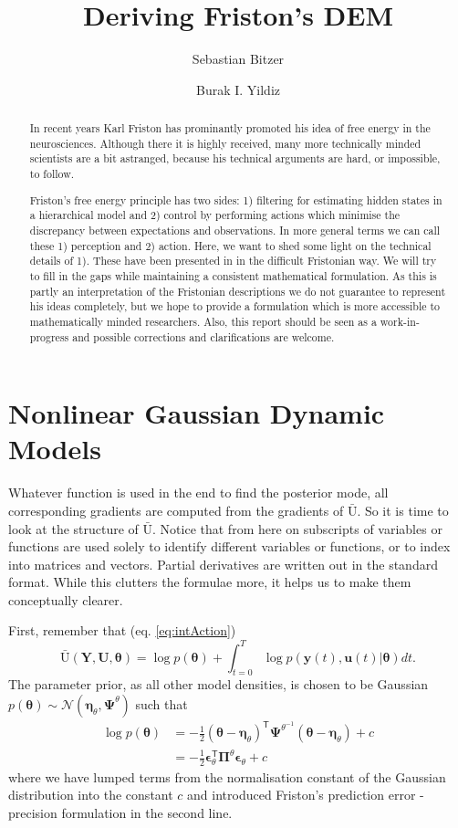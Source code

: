 \documentclass[a4paper,10pt]{article}
\title{Deriving Friston's DEM}
\author{Sebastian Bitzer \and Burak I. Yildiz}
\newcommand{\bs}[1]{\mathbf{#1}}					%
\newcommand{\bgs}[1]{\boldsymbol{#1}}				%
\newcommand{\tr}{\mathsf{T}}				%
\renewcommand{\ss}{u}         %
\newcommand{\so}{y}         %
\newcommand{\spe}{\epsilon} %
\renewcommand{\sp}{\theta}    %
\newcommand{\ps}{\bs{\ss}}    %
\newcommand{\po}{\bs{\so}}    %
\newcommand{\ppe}{\bgs{\spe}} %
\newcommand{\pp}{\bgs{\sp}} %
\newcommand{\Ps}{\bs{U}}    %
\newcommand{\Po}{\bs{Y}}    %
\newcommand{\Ua}{\bar{\mathrm{U}}}		%
\newcommand{\N}{\mathcal{N}}			%
\begin{document}
\maketitle

\begin{abstract}
In recent years Karl Friston has prominantly promoted his idea of free energy in the neurosciences. Although there it is highly received, many more technically minded scientists are a bit astranged, because his technical arguments are hard, or impossible, to follow.

Friston's free energy principle has two sides: 1) filtering for estimating hidden states in a hierarchical model and 2) control by performing actions which minimise the discrepancy between expectations and observations. In more general terms we can call these 1) perception and 2) action. Here, we want to shed some light on the technical details of 1). These have been presented in \cite{Friston2008a,Friston2008} in the difficult Fristonian way. We will try to fill in the gaps while maintaining a consistent mathematical formulation. As this is partly an interpretation of the Fristonian descriptions we do not guarantee to represent his ideas completely, but we hope to provide a formulation which is more accessible to mathematically minded researchers. Also, this report should be seen as a work-in-progress and possible corrections and clarifications are welcome.
\end{abstract}

\newpage
\tableofcontents

\section{Nonlinear Gaussian Dynamic Models}
Whatever function is used in the end to find the posterior mode, all corresponding gradients are computed from the gradients of $\Ua$. So it is time to look at the structure of $\Ua$. Notice that from here on subscripts of variables or functions are used solely to identify different variables or functions, or to index into matrices and vectors. Partial derivatives are written out in the standard format. While this clutters the formulae more, it helps us to make them conceptually clearer.

First, remember that (eq. \ref{eq:intAction})
\[
    \Ua(\Po,\Ps,\pp) = \log p(\pp) + \int_{t=0}^T \log p(\po(t),\ps(t)|\pp)dt.
\]
The parameter prior, as all other model densities, is chosen to be Gaussian $p(\pp)\sim \N(\bgs{\eta}_\sp,\bgs{\Psi}^\sp)$ such that 
\begin{align}
    \log p(\pp) &= -\frac{1}{2}(\pp - \bgs{\eta}_\sp)^\tr\bgs{\Psi}^{\sp^{-1}}(\pp - \bgs{\eta}_\sp) + c\\
    &= -\frac{1}{2}\ppe_\sp^\tr\bgs{\Pi}^{\sp}\ppe_\sp + c
\end{align}
where we have lumped terms from the normalisation constant of the Gaussian distribution into the constant $c$ and introduced Friston's prediction error - precision formulation in the second line.
\end{document}
